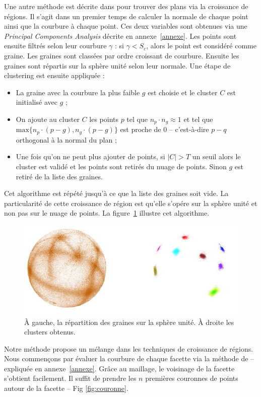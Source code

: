 ﻿\documentclass[12pt, twoside]{article}
\begin{document}
Une autre méthode est décrite dans \cite{reggrow3} pour trouver des plans via la croissance de régions. Il s'agit dans un premier temps de calculer la normale de chaque point ainsi que la courbure à chaque point. Ces deux variables sont obtenues via une \textit{Principal Components Analysis} décrite en annexe~\ref{annexe}. Les points sont ensuite filtrés selon leur courbure $\gamma$ : si $\gamma < S_c$, alors le point est considéré comme graine. Les graines sont classées par ordre croissant de courbure. Ensuite les graines sont répartis sur la sphère unité selon leur normale. Une étape de clustering est ensuite appliquée :
\begin{itemize}
  \item La graine avec la courbure la plus faible $g$ est choisie et le cluster $C$ est initialisé avec $g$ ;
  \item On ajoute au cluster $C$ les points $p$ tel que $n_p\cdot n_g \approx 1$ et tel que $\text{max}\{n_p\cdot(p-g), n_g\cdot(p-g)\}$ est proche de 0 -- c'est-à-dire $p-q$ orthogonal à la normal du plan ;
  \item Une fois qu'on ne peut plus ajouter de points, si $\vert C\vert > T$ un seuil alors le cluster est validé et les points sont retirés du nuage de points. Sinon $g$ est retiré de la liste des graines.
\end{itemize}
Cet algorithme est répété jusqu'à ce que la liste des graines soit vide. La particularité de cette croissance de région est qu'elle s'opére sur la sphère unité et non pas sur le nuage de points. La figure~\ref{fig:GaussMap} illustre cet algorithme.

\begin{figure}[h]
\centering
\includegraphics[scale=0.65]{GaussMap.png}
\caption{\label{fig:GaussMap} À gauche, la répartition des graines sur la sphère unité. À droite les clusters obtenus.}
\end{figure}

Notre méthode propose un mélange dans les techniques de croissance de régions. Nous commençons par évaluer la courbure de chaque facette via la méthode de \cite{reggrow3} -- expliquée en annexe~\ref{annexe}. Grâce au maillage, le voisinage de la facette s'obtient facilement. Il suffit de prendre les $n$ premières couronnes de points autour de la facette -- Fig \ref{fig:couronne}.
\end{document}
